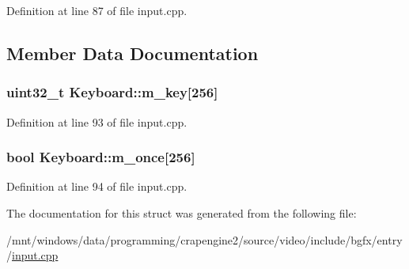 Definition at line 87 of file input.\+cpp.



\subsection{Member Data Documentation}
\hypertarget{struct_keyboard_a944513802a9cf2a7454b688f1a16d0d9}{
\subsubsection[{m\+\_\+key}]{\setlength{\rightskip}{0pt plus 5cm}uint32\+\_\+t Keyboard\+::m\+\_\+key\mbox{[}256\mbox{]}}}\label{struct_keyboard_a944513802a9cf2a7454b688f1a16d0d9}


Definition at line 93 of file input.\+cpp.

\hypertarget{struct_keyboard_a860c38146c813be2c304b9b64703dc99}{
\subsubsection[{m\+\_\+once}]{\setlength{\rightskip}{0pt plus 5cm}bool Keyboard\+::m\+\_\+once\mbox{[}256\mbox{]}}}\label{struct_keyboard_a860c38146c813be2c304b9b64703dc99}


Definition at line 94 of file input.\+cpp.



The documentation for this struct was generated from the following file\+:\begin{DoxyCompactItemize}
\item 
/mnt/windows/data/programming/crapengine2/source/video/include/bgfx/entry/\hyperlink{input_8cpp}{input.\+cpp}\end{DoxyCompactItemize}
